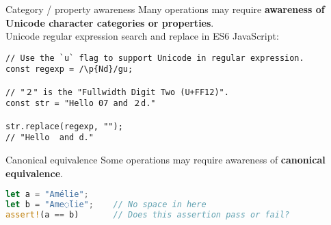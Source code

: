 \documentclass[../index.tex]{subfiles}
\begin{document}
\renewcommand{\currenttitle}{Category / property awareness}
\begin{frame}[fragile]{\currenttitle}
%
%
%
  Many operations may require \textbf{awareness of Unicode character categories or
  properties}. \\[2em]

  Unicode regular expression search and replace in ES6 JavaScript:  \\[1em]

  \begin{lstlisting}[language=ES6]
// Use the `u` flag to support Unicode in regular expression.
const regexp = /\p{Nd}/gu;

// "２" is the "Fullwidth Digit Two (U+FF12)".
const str = "Hello 07 and ２d." 

str.replace(regexp, "");          
// "Hello  and d."
  \end{lstlisting}
\end{frame}

\renewcommand{\currenttitle}{Canonical equivalence}
\begin{frame}[fragile]{\currenttitle}
%
%
  Some operations may require awareness of \textbf{canonical equivalence}. \\[1em]

  \begin{lstlisting}[language=Rust]
let a = "Amélie";
let b = "Ame◌́lie";    // No space in here
assert!(a == b)       // Does this assertion pass or fail?
  \end{lstlisting}

\end{frame}
\end{document}
